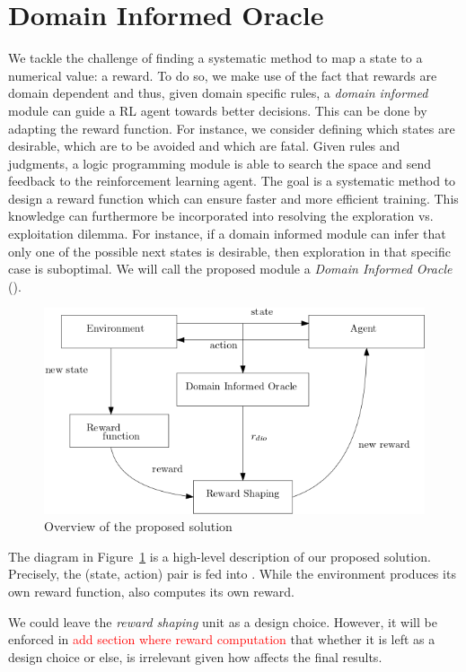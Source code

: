 \section{Domain Informed Oracle} 
We tackle the challenge of finding a systematic method to map a state to a numerical value: a reward. 
To do so, we make use of the fact that rewards are domain dependent and thus, given domain specific rules, a \emph{domain informed} module can guide a RL agent towards better decisions. This can be done by 
adapting the reward function. For instance, we consider defining which states are desirable, which are to be avoided and which are fatal. Given rules and judgments, a logic programming module 
is able to search the space and send feedback to the reinforcement learning agent. The goal is a systematic method to design a reward function which can ensure faster and more efficient 
training. This knowledge can furthermore be incorporated into resolving the exploration vs. exploitation dilemma. For instance, if a domain informed module 
can infer that only one of the possible next states is desirable, then exploration in that specific case is suboptimal.  
We will call the proposed module a \emph{Domain Informed Oracle}
(\dio{}).

\begin{figure}[H]
  \centering
  \includegraphics[scale=0.45]{figures/overview.png}
  \caption{Overview of the proposed solution}
  \label{fig:overview}
\end{figure}


The diagram in Figure~\ref{fig:overview} is a high-level description of our proposed solution. 
%
Precisely, the (state, action) pair is fed into \dio{}. While the environment produces its own 
reward function, \dio{} also computes its own reward. 

We could leave the \emph{reward shaping} unit as a design choice. However, it will be enforced in \textcolor{red}{add section where reward computation} 
that whether it is left as a design choice or else, is irrelevant given how\dio{} affects the final results.

